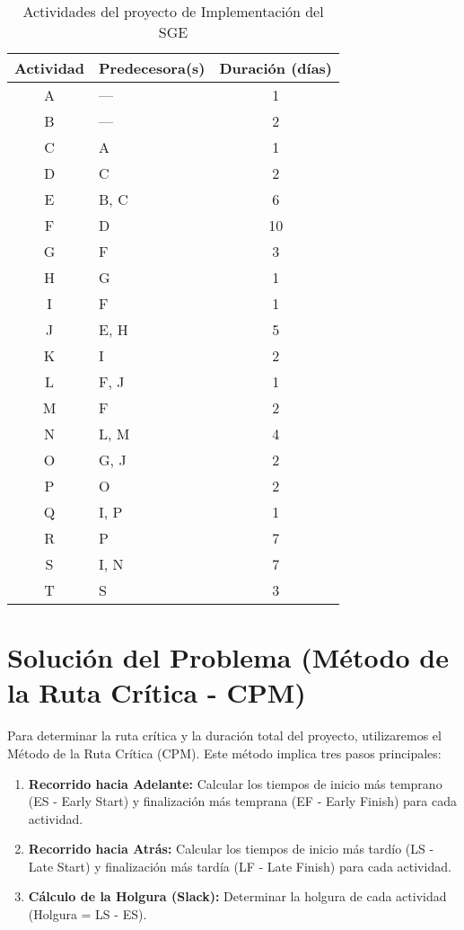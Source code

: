 \documentclass[a4paper,9pt]{article}
\begin{document}
\begin{table}[h]
\centering
\caption{Actividades del proyecto de Implementación del SGE}
\label{tab:problema647_sistemas}
\begin{tabular}{@{}clc@{}}
\toprule
\textbf{Actividad} & \textbf{Predecesora(s)} & \textbf{Duración (días)} \\
\midrule
A & --- & 1 \\
B & --- & 2 \\
C & A & 1 \\
D & C & 2 \\
E & B, C & 6 \\
F & D & 10 \\
G & F & 3 \\
H & G & 1 \\
I & F & 1 \\
J & E, H & 5 \\
K & I & 2 \\
L & F, J & 1 \\
M & F & 2 \\
N & L, M & 4 \\
O & G, J & 2 \\
P & O & 2 \\
Q & I, P & 1 \\
R & P & 7 \\
S & I, N & 7 \\
T & S & 3 \\
\bottomrule
\end{tabular}
\end{table}

\section*{Solución del Problema (Método de la Ruta Crítica - CPM)}
Para determinar la ruta crítica y la duración total del proyecto, utilizaremos el Método de la Ruta Crítica (CPM). Este método implica tres pasos principales:
\begin{enumerate}
    \item \textbf{Recorrido hacia Adelante:} Calcular los tiempos de inicio más temprano (ES - Early Start) y finalización más temprana (EF - Early Finish) para cada actividad.
    \item \textbf{Recorrido hacia Atrás:} Calcular los tiempos de inicio más tardío (LS - Late Start) y finalización más tardía (LF - Late Finish) para cada actividad.
    \item \textbf{Cálculo de la Holgura (Slack):} Determinar la holgura de cada actividad (Holgura = LS - ES).
\end{enumerate}
\end{document}

